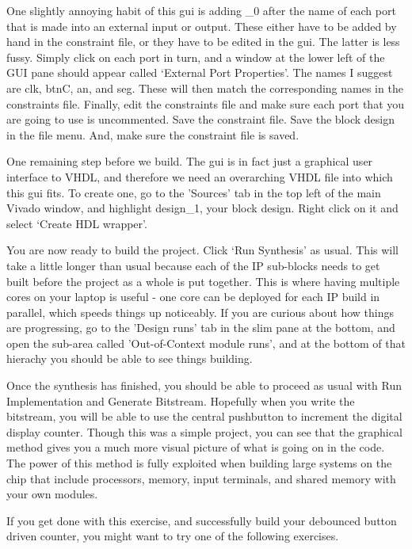 \documentclass[../physical_computing.tex]{subfiles}
\begin{document}
One slightly annoying habit of this gui is adding \_0 after the name of each port that is made into an external input or output. These either have to be added by hand in the constraint file, or they have to be edited in the gui. The latter is less fussy. Simply click on each port in turn, and a window at the lower left of the GUI pane should appear called `External Port Properties'. The names I suggest are clk, btnC, an, and seg. These will then match the corresponding names in the constraints file. Finally, edit the constraints file and make sure each port that you are going to use is uncommented. Save the constraint file. Save the block design in the file menu. And, make sure the constraint file is saved.

One remaining step before we build. The gui is in fact just a graphical user interface to VHDL, and therefore we need an overarching VHDL file into which this gui fits. To create one, go to the 'Sources' tab in the top left of the main Vivado window, and highlight design\_1, your block design. Right click on it and select `Create HDL wrapper'. 

You are now ready to build the project. Click `Run Synthesis' as usual. This will take a little longer than usual because each of the IP sub-blocks needs to get built before the project as a whole is put together. This is where having multiple cores on your laptop is useful - one core can be deployed for each IP build in parallel, which speeds things up noticeably. If you are curious about how things are progressing, go to the 'Design runs' tab in the slim pane at the bottom, and open the sub-area called 'Out-of-Context module runs', and at the bottom of that hierachy you should be able to see things building.

Once the synthesis has finished, you should be able to proceed as usual with Run Implementation and Generate Bitstream. Hopefully when you write the bitstream, you will be able to use the central pushbutton to increment the digital display counter. Though this was a simple project, you can see that the graphical method gives you a much more visual picture of what is going on in the code. The power of this method is fully exploited when building large systems on the chip that include processors, memory, input terminals, and shared memory with your own modules.

If you get done with this exercise, and successfully build your debounced button driven counter, you might want to try
one of the following exercises.
\end{document}
